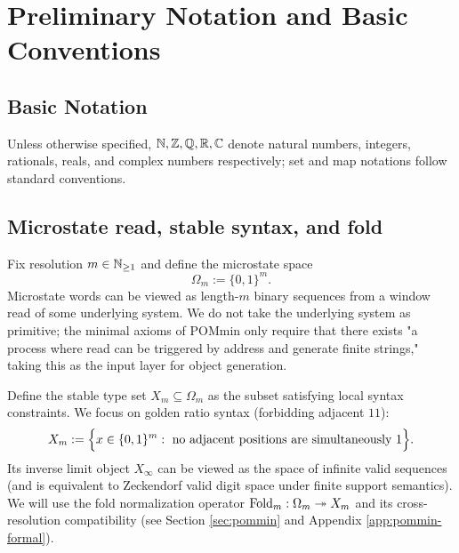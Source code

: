 \section{Preliminary Notation and Basic Conventions}\label{sec:preliminaries}

\subsection{Basic Notation}
Unless otherwise specified, $\mathbb{N},\mathbb{Z},\mathbb{Q},\mathbb{R},\mathbb{C}$ denote natural numbers, integers, rationals, reals, and complex numbers respectively; set and map notations follow standard conventions.\par

\subsection{Microstate read, stable syntax, and fold}
Fix resolution $m\in\mathbb{N}_{\ge 1}$ and define the microstate space
$$
\Omega_m := \{0,1\}^m.
$$
Microstate words can be viewed as length-$m$ binary sequences from a window read of some underlying system. We do not take the underlying system as primitive; the minimal axioms of POMmin only require that there exists "a process where read can be triggered by address and generate finite strings," taking this as the input layer for object generation.\par
Define the stable type set $X_m\subseteq\Omega_m$ as the subset satisfying local syntax constraints. We focus on golden ratio syntax (forbidding adjacent $11$):
$$
X_m := \Bigl\{x\in\{0,1\}^m:\ \text{no adjacent positions are simultaneously }1\Bigr\}.
$$
Its inverse limit object $X_\infty$ can be viewed as the space of infinite valid sequences (and is equivalent to Zeckendorf valid digit space under finite support semantics). We will use the fold normalization operator $\mathrm{Fold}_m:\Omega_m\twoheadrightarrow X_m$ and its cross-resolution compatibility (see Section \ref{sec:pommin} and Appendix \ref{app:pommin-formal}).\par

